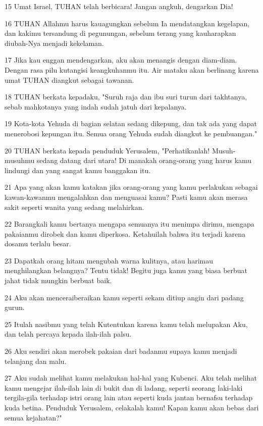 \par 15 Umat Israel, TUHAN telah berbicara! Jangan angkuh, dengarkan Dia!
\par 16 TUHAN Allahmu harus kauagungkan sebelum Ia mendatangkan kegelapan, dan kakimu tersandung di pegunungan, sebelum terang yang kauharapkan diubah-Nya menjadi kekelaman.
\par 17 Jika kau enggan mendengarkan, aku akan menangis dengan diam-diam. Dengan rasa pilu kutangisi keangkuhanmu itu. Air mataku akan berlinang karena umat TUHAN diangkut sebagai tawanan.
\par 18 TUHAN berkata kepadaku, "Suruh raja dan ibu suri turun dari takhtanya, sebab mahkotanya yang indah sudah jatuh dari kepalanya.
\par 19 Kota-kota Yehuda di bagian selatan sedang dikepung, dan tak ada yang dapat menerobosi kepungan itu. Semua orang Yehuda sudah diangkut ke pembuangan."
\par 20 TUHAN berkata kepada penduduk Yerusalem, "Perhatikanlah! Musuh-musuhmu sedang datang dari utara! Di manakah orang-orang yang harus kamu lindungi dan yang sangat kamu banggakan itu.
\par 21 Apa yang akan kamu katakan jika orang-orang yang kamu perlakukan sebagai kawan-kawanmu mengalahkan dan menguasai kamu? Pasti kamu akan merasa sakit seperti wanita yang sedang melahirkan.
\par 22 Barangkali kamu bertanya mengapa semuanya itu menimpa dirimu, mengapa pakaianmu dirobek dan kamu diperkosa. Ketahuilah bahwa itu terjadi karena dosamu terlalu besar.
\par 23 Dapatkah orang hitam mengubah warna kulitnya, atau harimau menghilangkan belangnya? Tentu tidak! Begitu juga kamu yang biasa berbuat jahat tidak mungkin berbuat baik.
\par 24 Aku akan menceraiberaikan kamu seperti sekam ditiup angin dari padang gurun.
\par 25 Itulah nasibmu yang telah Kutentukan karena kamu telah melupakan Aku, dan telah percaya kepada ilah-ilah palsu.
\par 26 Aku sendiri akan merobek pakaian dari badanmu supaya kamu menjadi telanjang dan malu.
\par 27 Aku sudah melihat kamu melakukan hal-hal yang Kubenci. Aku telah melihat kamu mengejar ilah-ilah lain di bukit dan di ladang, seperti seorang laki-laki tergila-gila terhadap istri orang lain atau seperti kuda jantan bernafsu terhadap kuda betina. Penduduk Yerusalem, celakalah kamu! Kapan kamu akan bebas dari semua kejahatan?"

